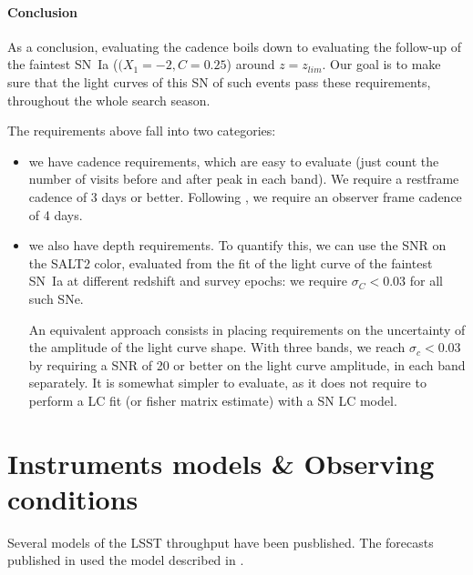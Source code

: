\documentclass[\docopts]{\docclass}
\begin{document}
\paragraph{Conclusion} As a conclusion, evaluating the cadence boils
down to evaluating the follow-up of the faintest SN~Ia ($(X_1=-2,
C=0.25$) around $z = z_{lim}$. Our goal is to make sure that the light
curves of this SN of such events pass these requirements, throughout
the whole search season.

The requirements above fall into two categories: 
\begin{itemize}
\item we have  cadence requirements, which are easy  to evaluate (just
  count the number of visits before  and after peak in each band).  We
  require  a  restframe  cadence  of  3  days  or  better.   Following
  \cite{2014A&A...572A..80A}, we require an  observer frame cadence of
  4 days.

\item we also have depth requirements.  To quantify this, we can use
  the SNR on the SALT2 color, evaluated from the fit of the light
  curve of the faintest SN~Ia at different redshift and survey epochs:
  we require $\sigma_C < 0.03$ for all such SNe.

  An equivalent approach consists in placing requirements on the
  uncertainty of the amplitude of the light curve shape.  With three
  bands, we reach $\sigma_c < 0.03$ by requiring a SNR of 20 or better
  on the light curve amplitude, in each band separately.  It is
  somewhat simpler to evaluate, as it does not require to perform a LC
  fit (or fisher matrix estimate) with a SN LC model.
\end{itemize}




\section{Instruments models \& Observing conditions}
\label{sec:instrument_model_summary}

Several models of the LSST throughput have been pusblished.  The
forecasts published in \cite{2014A&A...572A..80A} used the model
described in \cite[][hereafter LSE-40]{LSE-40}. 
\end{document}
